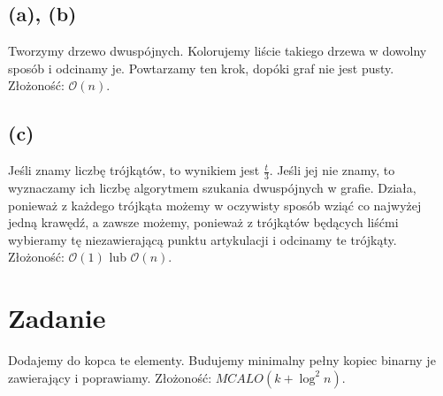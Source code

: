 \documentclass[12pt, a4paper]{article}
\newcommand{\MCALO}{\mathcal{O}}
\newcounter{zadanie}
\newcommand{\zadanie}{\addtocounter{zadanie}{1}\section*{Zadanie \arabic{zadanie}}}
\begin{document}
\subsection*{(a), (b)}
Tworzymy drzewo dwuspójnych. Kolorujemy liście takiego drzewa w dowolny sposób
i odcinamy je. Powtarzamy ten krok, dopóki graf nie jest pusty.
Złożoność: $\MCALO(n)$.

\subsection*{(c)}
Jeśli znamy liczbę trójkątów, to wynikiem jest $\frac{t}{3}$. Jeśli jej nie
znamy, to wyznaczamy ich liczbę algorytmem szukania dwuspójnych w grafie.
Działa, ponieważ z każdego trójkąta możemy w oczywisty sposób wziąć co najwyżej
jedną krawędź, a zawsze możemy, ponieważ z trójkątów będących liśćmi wybieramy
tę niezawierającą punktu artykulacji i odcinamy te trójkąty.
Złożoność: $\MCALO(1)$ lub $\MCALO(n)$.

\zadanie{}
Dodajemy do kopca te elementy. Budujemy minimalny pełny kopiec binarny je
zawierający i poprawiamy. Złożoność: $MCALO(k + \log^2{n})$.
\end{document}

